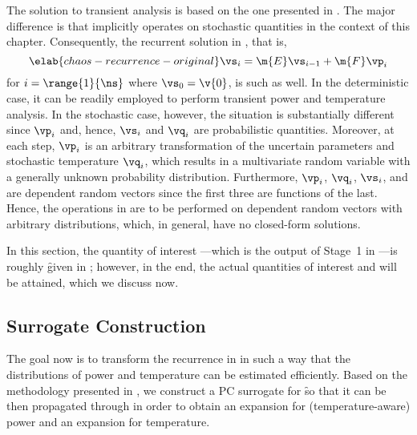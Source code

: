 The solution to transient analysis is based on the one presented in
. The major difference is that
 implicitly operates on stochastic quantities in the
context of this chapter. Consequently, the recurrent solution in
, that is,
\begin{equation} \elab{chaos-recurrence-original}
  \vs_i = \m{E} \vs_{i - 1} + \m{F} \vp_i
\end{equation}
for $i = \range{1}{\ns}$ where $\vs_0 = \v{0}$, is such as well. In the
deterministic case, it can be readily employed to perform transient power and
temperature analysis. In the stochastic case, however, the situation is
substantially different since $\vp_i$ and, hence, $\vs_i$ and $\vq_i$ are
probabilistic quantities. Moreover, at each step, $\vp_i$ is an arbitrary
transformation of the uncertain parameters \vu and stochastic temperature
$\vq_i$, which results in a multivariate random variable with a generally
unknown probability distribution. Furthermore, $\vp_i$, $\vq_i$, $\vs_i$, and
\vu are dependent random vectors since the first three are functions of the
last. Hence, the operations in  are to be
performed on dependent random vectors with arbitrary distributions, which, in
general, have no closed-form solutions.

In this section, the quantity of interest \g---which is the output of Stage~1 in
---is roughly \f given in ;
however, in the end, the actual quantities of interest \mp and \mq will be
attained, which we discuss now.

\subsection{Surrogate Construction}

The goal now is to transform the recurrence in 
in such a way that the distributions of power and temperature can be estimated
efficiently. Based on the methodology presented in
, we construct a \ac{PC} surrogate for \f so
that it can be then propagated through  in order
to obtain an expansion for (temperature-aware) power and an expansion for
temperature.

